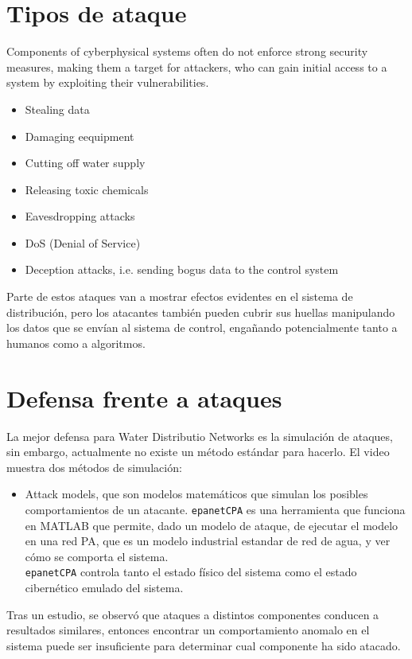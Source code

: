 \section{Tipos de ataque}
Components of cyberphysical systems often do not enforce strong security measures, making them a target for attackers, who can gain initial access to a system by exploiting their vulnerabilities.     
\begin{itemize}
   \item Stealing data
   \item Damaging eequipment
   \item Cutting off water supply
   \item Releasing toxic chemicals
   \item Eavesdropping attacks
   \item DoS (Denial of Service)
   \item Deception attacks, i.e. sending bogus data to the control system
\end{itemize}

Parte de estos ataques van a mostrar efectos evidentes en el sistema de distribución, pero los atacantes también pueden cubrir sus huellas manipulando los datos que se envían al sistema de control, engañando potencialmente tanto a humanos como a algoritmos.

\section{Defensa frente a ataques}
La mejor defensa para Water Distributio Networks es la simulación de ataques, sin embargo, actualmente no existe un método estándar para hacerlo.
El video muestra dos métodos de simulación:
\begin{itemize}
   \item Attack models, que son modelos matemáticos que simulan los posibles comportamientos de un atacante. \texttt{epanetCPA} es una herramienta que funciona en MATLAB que permite, dado un modelo de ataque, de ejecutar el modelo en una red PA, que es un modelo industrial estandar de red de agua, y ver cómo se comporta el sistema.\\
   \texttt{epanetCPA} controla tanto el estado físico del sistema como el estado cibernético emulado del sistema.\\
\end{itemize}

Tras un estudio, se observó que ataques a distintos componentes conducen a resultados similares, entonces encontrar un comportamiento anomalo en el sistema puede ser insuficiente para determinar cual componente ha sido atacado.\\